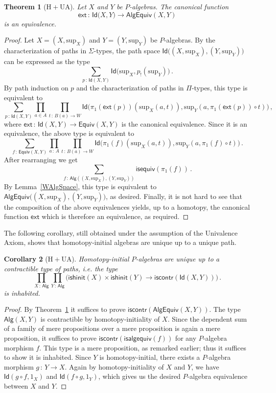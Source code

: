 \documentclass[10pt,a4paper,oneside,reqno]{amsart}
\theoremstyle{mythm}
\newtheorem{theorem}{Theorem}[section]
\newtheorem{corollary}[theorem]{Corollary}
\theoremstyle{mydef}
\theoremstyle{myrmk}
\newcommand{\co}{\,{:}\,}
\newcommand{\Hint}{\mathrm{H}}
\newcommand{\UA}{\mathrm{UA}}
\newcommand{\iscontr}{\mathsf{iscontr}}
\newcommand{\isequiv}{\mathsf{isequiv}}
\newcommand{\isalghinit}{\mathsf{ishinit}}
\newcommand{\ext}{\mathsf{ext}}
\newcommand{\Id}{\mathsf{Id}}
\newcommand{\Palg}{\mathsf{Alg}}
\renewcommand{\sup}{\mathrm{sup}}
\newcommand{\isalgequiv}{\mathsf{isalgequiv}}
\newcommand{\AlgEquiv}{\mathsf{AlgEquiv}}
\begin{document}
\begin{theorem}[$\Hint + \UA$] \label{thm:Punivalence}
Let $X$ and $Y$ be $P$-algebras. The canonical function
\[ 
\ext \co \Id \big(X,Y\big) \to  \AlgEquiv(X,Y) 
\]
is an equivalence.
\end{theorem}

\begin{proof} 
Let $X = (X,\sup_X)$ and $Y= (Y,\sup_Y)$ be $P$-algebras. By the characterization of paths in $\Sigma$-types, the path space 
$\Id \big( (X,\sup_X) ,  (Y,\sup_Y) \big)$ can be expressed as the type
\[
\sum_{p \co \Id(X, Y)} \Id \big( \sup_X ,  p_{!}(\sup_Y)  \big) \, .
\]
By path induction on $p$ and the characterization of paths in $\Pi$-types, this type is equivalent to
\[  
\sum_{p \co \Id(X,Y)}  
\prod_{a \in A} 
\prod_{t \co B(a) \to W} 
\Id \big(  \pi_1(\ext(p))( \sup_X(a,t)),  \sup_Y(a, \pi_1(\ext (p)) \circ t) \big) \, , 
\]
where $\ext \co \Id(X,Y) \to \mathsf{Equiv}(X,Y)$ is the canonical equivalence. Since it is an equivalence, the above type is equivalent to
\[
\sum_{f \co \mathsf{Equiv}(X,Y)} \prod_{a \co A} \prod_{t \co B(a) \to W} \Id \big( \pi_1(f) (\sup_X(a,t))  , \sup_Y (a, \pi_1(f) \circ t) \big) \, .
\]
After rearranging we get
\[
\sum_{f \co \Palg ( (X,\sup_X),  (Y,\sup_Y) )}  \isequiv(\pi_1(f)) \, .
\]
By Lemma~\ref{WAlgSpace}, this type is equivalent to $\AlgEquiv \big( (X,\sup_X),  (Y,\sup_Y)\big)$, as desired. Finally, it is not hard to see that the composition of the above equivalences yields, up to a homotopy, the canonical function $\ext$ which is therefore an equivalence, as required.
\end{proof} 

The following corollary, still obtained under the assumption of the Univalence Axiom, shows that
homotopy-initial algebras are unique up to a unique path.

\begin{corollary}[$\Hint + \UA$] \label{WHInitIso}
Homotopy-initial $P$-algebras are unique up to a  contractible type of paths, i.e. the type
\[ 
\prod_{X \co \Palg} \prod_{Y \co \Palg}  \Big( \isalghinit(X) \times \isalghinit(Y)  \to 
\iscontr(\Id(X,Y)) \Big) \, .
\] 
is inhabited.
\end{corollary}

\begin{proof}
By Theorem~\ref{thm:Punivalence} it suffices to prove $\iscontr(\AlgEquiv(X,Y))$. The type $\Palg(X,Y)$ is contractible by homotopy-initiality of $X$. Since the dependent sum of a family of mere propositions over a mere proposition is again a mere proposition, it suffices to prove $\iscontr(\isalgequiv(f))$ for any $P$-algebra morphism $f$. This type is a mere proposition, as remarked earlier; thus it suffices to show it is inhabited.
Since $Y$ is homotopy-initial, there exists a $P$-algebra morphism $g \co Y \to X$. Again by homotopy-initiality of $X$ and 
$Y$, we have $\Id(g \circ f, 1_X)$ and $\Id(f \circ g, 1_Y)$, which gives us the desired $P$-algebra equivalence between 
$X$ and $Y$.
\end{proof}
\end{document}
